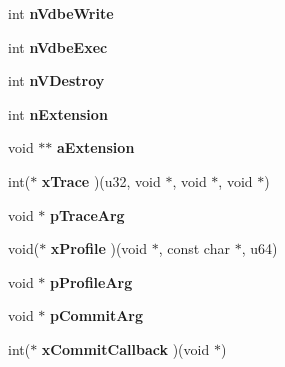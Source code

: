 \begin{DoxyCompactItemize}
\item 
int {\bfseries n\+Vdbe\+Write}\hypertarget{structsqlite3_aa63da8ce693d136df02033f1bdb85171}{}\label{structsqlite3_aa63da8ce693d136df02033f1bdb85171}

\item 
int {\bfseries n\+Vdbe\+Exec}\hypertarget{structsqlite3_a4f4a211154ba0cfbd43c57e25640dfff}{}\label{structsqlite3_a4f4a211154ba0cfbd43c57e25640dfff}

\item 
int {\bfseries n\+V\+Destroy}\hypertarget{structsqlite3_adfa504e8c5d87a41e191236d0ba80f0a}{}\label{structsqlite3_adfa504e8c5d87a41e191236d0ba80f0a}

\item 
int {\bfseries n\+Extension}\hypertarget{structsqlite3_aa57fc38ef27d8fa59221cb5c0e54f7fb}{}\label{structsqlite3_aa57fc38ef27d8fa59221cb5c0e54f7fb}

\item 
void $\ast$$\ast$ {\bfseries a\+Extension}\hypertarget{structsqlite3_aa97954113d8e35c97f8a3af534703f7b}{}\label{structsqlite3_aa97954113d8e35c97f8a3af534703f7b}

\item 
int($\ast$ {\bfseries x\+Trace} )(u32, void $\ast$, void $\ast$, void $\ast$)\hypertarget{structsqlite3_ad1da15bd3930c142e5cfd09c560d9e3d}{}\label{structsqlite3_ad1da15bd3930c142e5cfd09c560d9e3d}

\item 
void $\ast$ {\bfseries p\+Trace\+Arg}\hypertarget{structsqlite3_ae0920576e4e92f1b736255fcfad649d1}{}\label{structsqlite3_ae0920576e4e92f1b736255fcfad649d1}

\item 
void($\ast$ {\bfseries x\+Profile} )(void $\ast$, const char $\ast$, u64)\hypertarget{structsqlite3_ab0aefde204a9c4dead89396ba929e5ca}{}\label{structsqlite3_ab0aefde204a9c4dead89396ba929e5ca}

\item 
void $\ast$ {\bfseries p\+Profile\+Arg}\hypertarget{structsqlite3_a931c234df9b701c78de38ddf22869062}{}\label{structsqlite3_a931c234df9b701c78de38ddf22869062}

\item 
void $\ast$ {\bfseries p\+Commit\+Arg}\hypertarget{structsqlite3_a355237725d3a535d702815b6ef8be75e}{}\label{structsqlite3_a355237725d3a535d702815b6ef8be75e}

\item 
int($\ast$ {\bfseries x\+Commit\+Callback} )(void $\ast$)\hypertarget{structsqlite3_aafa01826b1329161f4fd7ed9a2579a93}{}\label{structsqlite3_aafa01826b1329161f4fd7ed9a2579a93}


\end{DoxyCompactItemize}
